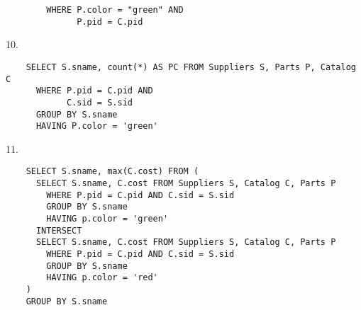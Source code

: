 \begin{problem}{5.2}
\begin{lstlisting}
        WHERE P.color = "green" AND
              P.pid = C.pid
  \end{lstlisting}
  10.
  \begin{lstlisting}
    SELECT S.sname, count(*) AS PC FROM Suppliers S, Parts P, Catalog C
      WHERE P.pid = C.pid AND
            C.sid = S.sid
      GROUP BY S.sname
      HAVING P.color = 'green'
  \end{lstlisting}
  11.
  \begin{lstlisting}
    SELECT S.sname, max(C.cost) FROM (
      SELECT S.sname, C.cost FROM Suppliers S, Catalog C, Parts P
        WHERE P.pid = C.pid AND C.sid = S.sid
        GROUP BY S.sname
        HAVING p.color = 'green'
      INTERSECT
      SELECT S.sname, C.cost FROM Suppliers S, Catalog C, Parts P
        WHERE P.pid = C.pid AND C.sid = S.sid
        GROUP BY S.sname
        HAVING p.color = 'red'
    )
    GROUP BY S.sname
  \end{lstlisting}
\end{problem}

\begin{problem}{5.4}
\end{problem}


